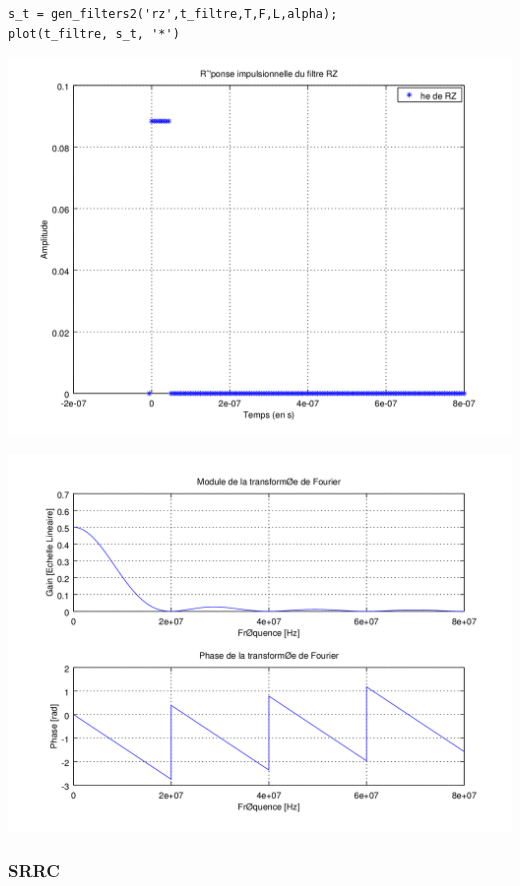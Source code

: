 \documentclass{acm_proc_article-sp}
\begin{document}
\begin{center}
\begin{lstlisting}
s_t = gen_filters2('rz',t_filtre,T,F,L,alpha);
plot(t_filtre, s_t, '*')
\end{lstlisting}

\includegraphics[scale=0.45]{RZ_3.png}

\includegraphics[scale=0.45]{RZ_rep_3.png}
\end{center}

\subsubsection{SRRC}
\end{document}
